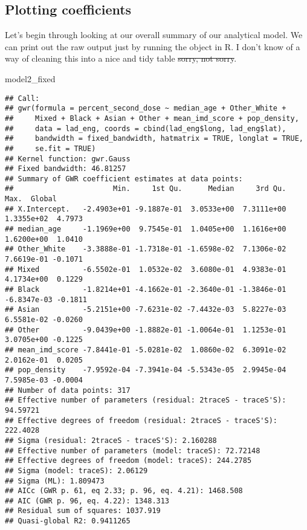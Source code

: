 \documentclass[
]{book}
\newenvironment{Shaded}{\begin{snugshade}}{\end{snugshade}}
\newcommand{\NormalTok}[1]{#1}
\begin{document}
\hypertarget{plotting-coefficients}{%
\subsection{Plotting coefficients}\label{plotting-coefficients}}

Let's begin through looking at our overall summary of our analytical model. We can print out the raw output just by running the object in R. I don't know of a way of cleaning this into a nice and tidy table \sout{sorry, not sorry}.

\begin{Shaded}
\begin{Highlighting}[]
\NormalTok{model2\_fixed}
\end{Highlighting}
\end{Shaded}

\begin{verbatim}
## Call:
## gwr(formula = percent_second_dose ~ median_age + Other_White + 
##     Mixed + Black + Asian + Other + mean_imd_score + pop_density, 
##     data = lad_eng, coords = cbind(lad_eng$long, lad_eng$lat), 
##     bandwidth = fixed_bandwidth, hatmatrix = TRUE, longlat = TRUE, 
##     se.fit = TRUE)
## Kernel function: gwr.Gauss 
## Fixed bandwidth: 46.81257 
## Summary of GWR coefficient estimates at data points:
##                       Min.     1st Qu.      Median     3rd Qu.        Max.  Global
## X.Intercept.   -2.4903e+01 -9.1887e-01  3.0533e+00  7.3111e+00  1.3355e+02  4.7973
## median_age     -1.1969e+00  9.7545e-01  1.0405e+00  1.1616e+00  1.6200e+00  1.0410
## Other_White    -3.3888e-01 -1.7318e-01 -1.6598e-02  7.1306e-02  7.6619e-01 -0.1071
## Mixed          -6.5502e-01  1.0532e-02  3.6080e-01  4.9383e-01  4.1734e+00  0.1229
## Black          -1.8214e+01 -4.1662e-01 -2.3640e-01 -1.3846e-01 -6.8347e-03 -0.1811
## Asian          -5.2151e+00 -7.6231e-02 -7.4432e-03  5.8227e-03  6.5581e-02 -0.0260
## Other          -9.0439e+00 -1.8882e-01 -1.0064e-01  1.1253e-01  3.0705e+00 -0.1225
## mean_imd_score -7.8441e-01 -5.0281e-02  1.0860e-02  6.3091e-02  2.0162e-01  0.0205
## pop_density    -7.9592e-04 -7.3941e-04 -5.5343e-05  2.9945e-04  7.5985e-03 -0.0004
## Number of data points: 317 
## Effective number of parameters (residual: 2traceS - traceS'S): 94.59721 
## Effective degrees of freedom (residual: 2traceS - traceS'S): 222.4028 
## Sigma (residual: 2traceS - traceS'S): 2.160288 
## Effective number of parameters (model: traceS): 72.72148 
## Effective degrees of freedom (model: traceS): 244.2785 
## Sigma (model: traceS): 2.06129 
## Sigma (ML): 1.809473 
## AICc (GWR p. 61, eq 2.33; p. 96, eq. 4.21): 1468.508 
## AIC (GWR p. 96, eq. 4.22): 1348.313 
## Residual sum of squares: 1037.919 
## Quasi-global R2: 0.9411265
\end{verbatim}
\end{document}
